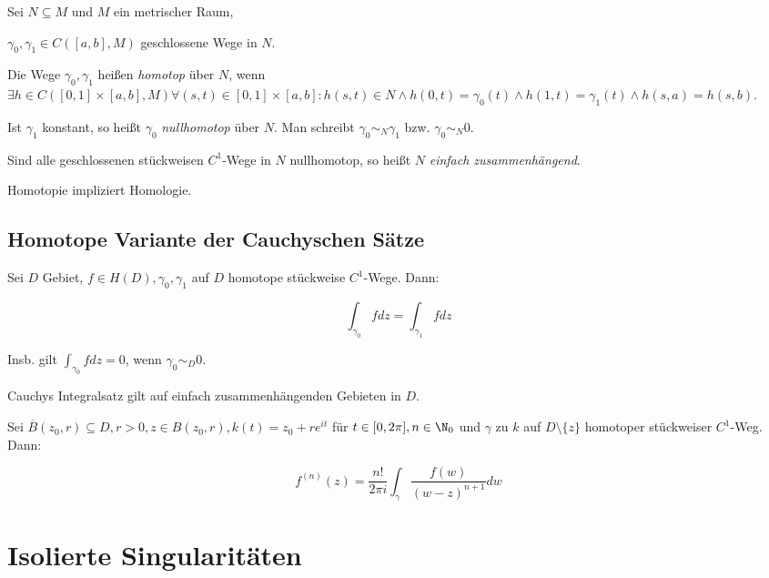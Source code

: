 Sei \(N \subseteq M\) und \(M\) ein metrischer Raum,

\(\gamma_0, \gamma_1 \in C([a,b],M)\) geschlossene Wege in \(N\).

\vspace*{1mm}

Die Wege \(\gamma_0, \gamma_1\) heißen \emph{homotop} über \(N\), wenn \(\exists h \in C([0,1] \times [a,b],M) \forall (s,t) \in [0,1] \times [a,b] : h(s,t) \in N \land h(0,t)=\gamma_0(t) \land h(1,t) = \gamma_1(t) \land h(s,a) = h(s,b)\).

\vspace*{1mm}

Ist \(\gamma_1\) konstant, so heißt \(\gamma_0\) \emph{nullhomotop} über \(N\). Man schreibt \(\gamma_0 \sim_N \gamma_1\) bzw. \(\gamma_0 \sim_N 0\).

\vspace*{1mm}

Sind alle geschlossenen stückweisen \(C^1\)-Wege in \(N\) nullhomotop, so heißt \(N\) \emph{einfach zusammenhängend}.

\vspace*{1mm}

Homotopie impliziert Homologie.

\subsection*{Homotope Variante der Cauchyschen Sätze}

Sei \(D\) Gebiet, \(f \in H(D), \gamma_0, \gamma_1\) auf \(D\) homotope stückweise \(C^1\)-Wege. Dann:

\[ \int_{\gamma_0} f dz = \int_{\gamma_1} f dz \]

Insb. gilt \(\int_{\gamma_0} f dz = 0\), wenn \(\gamma_0 \sim_D 0\).

Cauchys Integralsatz gilt auf einfach zusammenhängenden Gebieten in \(D\).

\spacing

Sei \(\overline B(z_0,r) \subseteq D, r > 0, z \in B(z_0,r), k(t) = z_0 + re^{it}\) für \(t \in [0, 2\pi], n \in \N_0\) und \(\gamma\) zu \(k\) auf \(D \setminus \{z\}\) homotoper stückweiser \(C^1\)-Weg. Dann:

\[ f^{(n)}(z) = \frac{n!}{2\pi i} \int_\gamma \frac{f(w)}{(w-z)^{n+1}} dw \]

\section*{Isolierte Singularitäten}

